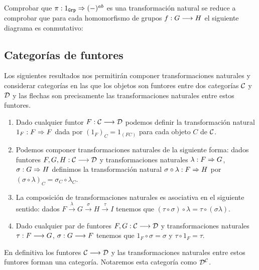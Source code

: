 Comprobar que $\pi: 1_{\texttt{Grp}}\Rightarrow (-)^{ab}$ es una transformación natural
se reduce a comprobar que para cada homomorfismo de grupos
$f: G\longrightarrow H$ el siguiente diagrama es conmutativo:
\begin{center}
\end{center}

\subsection{Categorías de funtores}
Los siguientes resultados nos permitirán componer
transformaciones naturales y considerar categorías en las
que los objetos son funtores entre dos categorías $\mathcal{C}$ y $\mathcal{D}$ y las
flechas son precisamente
las transformaciones naturales entre estos funtores.

\begin{proposition}
  \begin{enumerate}
  \item Dado cualquier funtor $F : \mathcal{C}\longrightarrow \mathcal{D}$ podemos definir
    la transformación natural $1_F : F\Rightarrow F$ dada por
    ${(1_F)}_C = 1_{(FC)}$
    para cada objeto $C$ de $\mathcal{C}$.
  \item Podemos componer transformaciones naturales de la siguiente
    forma: dados funtores $F, G, H : \mathcal{C}\longrightarrow \mathcal{D}$ y transformaciones
    naturales $\lambda : F\Rightarrow G$, $\sigma : G\Rightarrow H$
    definimos la transformación natural
    $\sigma \circ \lambda : F\Rightarrow H$ por
    $(\sigma\circ\lambda)_C = \sigma_C \circ \lambda_C$.
  \item La composición de transformaciones naturales
    es asociativa en el siguiente sentido: dados
    $F \xrightarrow{\lambda} G \xrightarrow{\sigma} H \xrightarrow{\tau}I$
    tenemos que $(\tau \circ \sigma) \circ \lambda = \tau \circ (\sigma \lambda)$.
  \item Dado cualquier par de funtores $F,G : \mathcal{C}\longrightarrow \mathcal{D}$ y
    transformaciones naturales $\tau : F\longrightarrow G$,
    $\sigma : G\longrightarrow F$ tenemos que $1_F \circ \sigma = \sigma$
    y $\tau \circ 1_F = \tau$.
  \end{enumerate}

  En definitiva los funtores $\mathcal{C}\longrightarrow \mathcal{D}$ y las transformaciones
  naturales entre estos funtores forman una categoría. Notaremos
  esta categoría
  como $\mathcal{D}^{\mathcal{C}}$.
\end{proposition}

